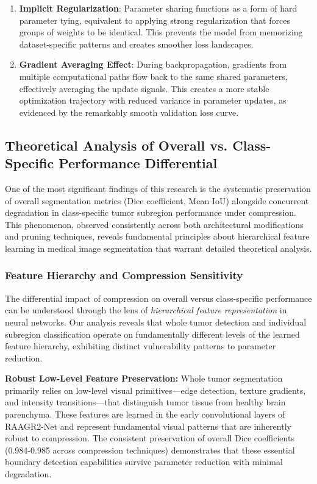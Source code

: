 \documentclass[12pt,a4paper]{article}
\begin{document}
\begin{enumerate}
\begin{enumerate}
\item \textbf{Implicit Regularization}: Parameter sharing functions as a form of hard parameter tying, equivalent to applying strong regularization that forces groups of weights to be identical. This prevents the model from memorizing dataset-specific patterns and creates smoother loss landscapes.

\item \textbf{Gradient Averaging Effect}: During backpropagation, gradients from multiple computational paths flow back to the same shared parameters, effectively averaging the update signals. This creates a more stable optimization trajectory with reduced variance in parameter updates, as evidenced by the remarkably smooth validation loss curve.
\end{enumerate}

\subsection{Theoretical Analysis of Overall vs. Class-Specific Performance Differential}

One of the most significant findings of this research is the systematic preservation of overall segmentation metrics (Dice coefficient, Mean IoU) alongside concurrent degradation in class-specific tumor subregion performance under compression. This phenomenon, observed consistently across both architectural modifications and pruning techniques, reveals fundamental principles about hierarchical feature learning in medical image segmentation that warrant detailed theoretical analysis.

\subsubsection{Feature Hierarchy and Compression Sensitivity}

The differential impact of compression on overall versus class-specific performance can be understood through the lens of \textit{hierarchical feature representation} in neural networks. Our analysis reveals that whole tumor detection and individual subregion classification operate on fundamentally different levels of the learned feature hierarchy, exhibiting distinct vulnerability patterns to parameter reduction.

\textbf{Robust Low-Level Feature Preservation:} Whole tumor segmentation primarily relies on low-level visual primitives—edge detection, texture gradients, and intensity transitions—that distinguish tumor tissue from healthy brain parenchyma. These features are learned in the early convolutional layers of RAAGR2-Net and represent fundamental visual patterns that are inherently robust to compression. The consistent preservation of overall Dice coefficients (0.984-0.985 across compression techniques) demonstrates that these essential boundary detection capabilities survive parameter reduction with minimal degradation.


\end{enumerate}
\end{document}
